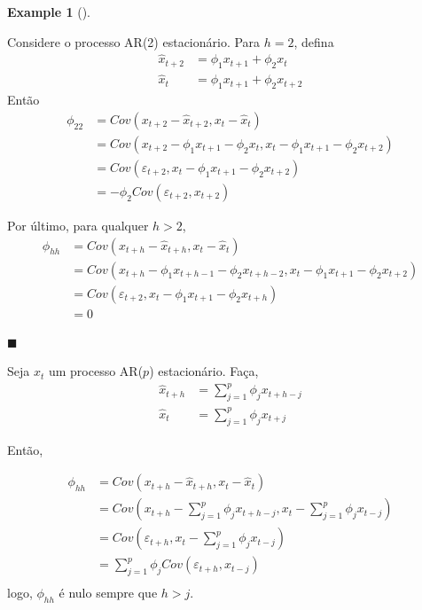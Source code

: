 \documentclass[
  letterpaper,
  DIV=11,
  numbers=noendperiod]{scrartcl}
\theoremstyle{definition}
\newtheorem{example}{Example}[chapter]
\theoremstyle{definition}
\theoremstyle{plain}
\theoremstyle{plain}
\theoremstyle{remark}
\begin{document}
\begin{example}[]\protect\hypertarget{exm-}{}\label{exm-}

Considere o processo AR(2) estacionário. Para \(h=2\), defina
\begin{align}\hat{x}_{t+2}&=\phi_1 x_{t+1}+\phi_2 x_{t}\\ \hat{x}_t&=\phi_1 x_{t+1}+\phi_2 x_{t+2}\end{align}
Então
\begin{align}\phi_{22}&=Cov(x_{t+2}-\hat{x}_{t+2}, x_t-\hat{x}_t)\\&=Cov(x_{t+2}-\phi_1 x_{t+1}-\phi_2 x_{t},x_t-\phi_1 x_{t+1}-\phi_2 x_{t+2})\\
&=Cov(\varepsilon_{t+2},x_t-\phi_1 x_{t+1} - \phi_2 x_{t+2})\\&=-\phi_2Cov(\varepsilon_{t+2},x_{t+2})\end{align}

Por último, para qualquer \(h>2\),
\begin{align}\phi_{hh}&=Cov(x_{t+h}-\hat{x}_{t+h}, x_t-\hat{x}_t)\\&=Cov(x_{t+h}-\phi_1 x_{t+h-1}-\phi_2 x_{t+h-2},x_t-\phi_1 x_{t+1}-\phi_2 x_{t+2})\\
&=Cov(\varepsilon_{t+2},x_t-\phi_1 x_{t+1} - \phi_2 x_{t+h})\\&=0\end{align}

\(\blacksquare\)

\end{example}

Seja \(x_t\) um processo AR(\(p\)) estacionário. Faça,
\begin{align}\hat{x}_{t+h}&=\sum_{j=1}^p \phi_j x_{t+h-j}\\ \hat{x}_t&=\sum_{j=1}^p \phi_j x_{t+j}\end{align}

Então,

\begin{align}\phi_{hh}&=Cov(x_{t+h}-\hat{x}_{t+h},x_t-\hat{x}_{t})\\
&=Cov\left(x_{t+h}-\sum_{j=1}^p\phi_j x_{t+h-j},x_{t}-\sum_{j=1}^p\phi_j x_{t-j} \right)\\
&=Cov\left(\varepsilon_{t+h},x_{t}-\sum_{j=1}^p\phi_j x_{t-j} \right)\\ &=\sum_{j=1}^p \phi_j Cov\left(\varepsilon_{t+h}, x_{t-j} \right)\\ \end{align}
logo, \(\phi_{hh}\) é nulo sempre que \(h>j\).
\end{document}

